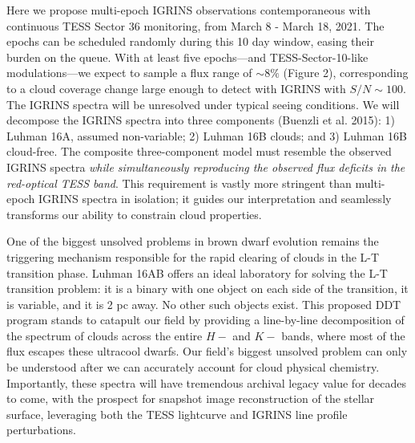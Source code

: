 \documentclass[11pt]{article}
\begin{document}
{Here we propose multi-epoch IGRINS observations contemporaneous with continuous TESS Sector 36 monitoring, from March 8 - March 18, 2021.  The epochs can be scheduled randomly during this 10 day window, easing their burden on the queue.  With at least five epochs---and TESS-Sector-10-like modulations---we expect to sample a flux range of $\sim 8\%$ (Figure 2), corresponding to a cloud coverage change large enough to detect with IGRINS with $S/N\sim100$.  The IGRINS spectra will be unresolved under typical seeing conditions.  We will decompose the IGRINS spectra into three components (Buenzli et al. 2015): 1) Luhman 16A, assumed non-variable; 2) Luhman 16B clouds; and 3) Luhman 16B cloud-free.  The composite three-component model must resemble the observed IGRINS spectra \emph{while simultaneously reproducing the observed flux deficits in the red-optical TESS band}.  This requirement is vastly more stringent than multi-epoch IGRINS spectra in isolation; it guides our interpretation and seamlessly transforms our ability to constrain cloud properties. 

One of the biggest unsolved problems in brown dwarf evolution remains the triggering mechanism responsible for the rapid clearing of clouds in the L-T transition phase.  Luhman 16AB offers an ideal laboratory for solving the L-T transition problem: it is a binary with one object on each side of the transition, it is variable, and it is 2 pc away. No other such objects exist. This proposed DDT program stands to catapult our field by providing a line-by-line decomposition of the spectrum of clouds across the entire $H-$ and $K-$ bands, where most of the flux escapes these ultracool dwarfs.  Our field's biggest unsolved problem can only be understood after we can accurately account for cloud physical chemistry.  Importantly, these spectra will have tremendous archival legacy value for decades to come, with the prospect for snapshot image reconstruction of the stellar surface, leveraging both the TESS lightcurve and IGRINS line profile perturbations.





\clearpage

}
\end{document}
